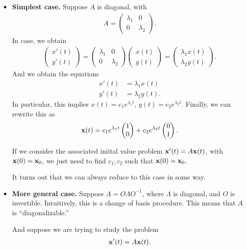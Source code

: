 \documentclass{article}
\newcommand{\mat}[1]{\begin{pmatrix}#1\end{pmatrix}}
\begin{document}
\begin{itemize}
  \item {\bf Simplest case.} Suppose $A$ is diagonal, with
    \begin{align*}
      A = \mat{\lambda_1 & 0 \\ 0 & \lambda_2}.
    \end{align*}
    In case, we obtain
    \begin{align*}
      \mat{x'(t) \\ y'(t)} = \mat{\lambda_1 & 0 \\ 0 & \lambda_2} \mat{x(t) \\ y(t)} = \mat{\lambda_1 x(t) \\ \lambda_2 y(t)}.
    \end{align*}
    And we obtain the equations
    \begin{align*}
      x'(t) &= \lambda_1 x(t) \\
      y'(t) &= \lambda_2 y(t).
    \end{align*}
    In particular, this implies $x(t) = c_1 e^{\lambda_1 t}$, $y(t) = c_2 e^{\lambda_2 t}$.  Finally, we can rewrite this as 
    \begin{align*}
      \mbf{x}(t) = c_1 e^{\lambda_1 t} \mat{1 \\ 0} + c_2 e^{\lambda_2 t} \mat{0 \\ 1}.
    \end{align*}

    If we consider the associated iniital value problem $\mathbf{x}'(t) = A \mathbf{x}(t)$, with $\mathbf{x}(0) = \mathbf{x}_0$, we just need to find $c_1, c_2$ such that $\mathbf{x}(0) = \mathbf{x}_0$.

    It turns out that we can always reduce to this case in some way.

  \item {\bf More general case.} Suppose $A = O \Lambda O^{-1}$, where $\Lambda$ is diagonal, and $O$ is invertible.  Intuitively, this is a change of basis procedure.  This means that $A$ is ``diagonalizable.''

    And suppose we are trying to study the problem
    \begin{align*}
      \mathbf{x}'(t) = A \mathbf{x}(t).
    \end{align*}


\end{itemize}
\end{document}
